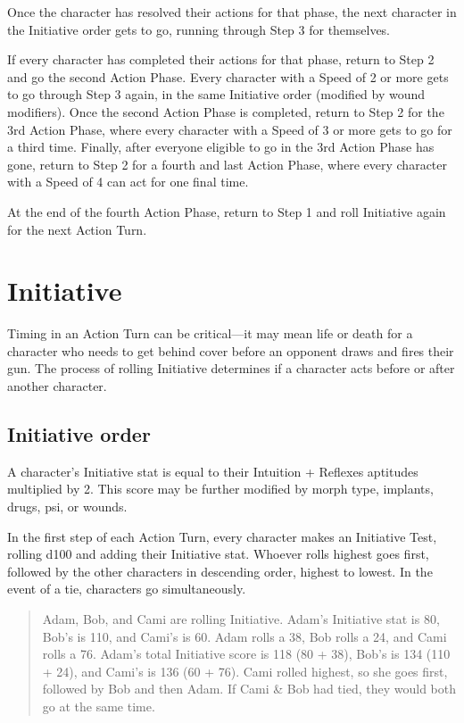 Once the character has resolved their actions for that phase, the next character in the Initiative order gets to go, running through Step 3 for themselves.

If every character has completed their actions for that phase, return to Step 2 and go the second Action Phase. Every character with a Speed of 2 or more gets to go through Step 3 again, in the same Initiative order (modified by wound modifiers). Once the second Action Phase is completed, return to Step 2 for the 3rd Action Phase, where every character with a Speed of 3 or more gets to go for a third time. Finally, after everyone eligible to go in the 3rd Action Phase has gone, return to Step 2 for a fourth and last Action Phase, where every character with a Speed of 4 can act for one final time.

At the end of the fourth Action Phase, return to Step 1 and roll Initiative again for the next Action Turn.


\section{Initiative}
\label{sec:initiative}

Timing in an Action Turn can be critical—it may mean life or death for a character who needs to get behind cover before an opponent draws and fires their gun. The process of rolling Initiative determines if a character acts before or after another character.


\subsection{Initiative order}
\label{sec:initiative-order}

A character’s Initiative stat is equal to their Intuition + Reflexes aptitudes multiplied by 2. This score may be further modified by morph type, implants, drugs, psi, or wounds.

In the first step of each Action Turn, every character makes an Initiative Test, rolling d100 and adding their Initiative stat. Whoever rolls highest goes first, followed by the other characters in descending order, highest to lowest. In the event of a tie, characters go simultaneously.

\begin{quotation}
Adam, Bob, and Cami are rolling Initiative. Adam’s Initiative stat is 80, Bob’s is 110, and Cami’s is 60. Adam rolls a 38, Bob rolls a 24, and Cami rolls a 76. Adam’s total Initiative score is 118 (80 + 38), Bob’s is 134 (110 + 24), and Cami’s is 136 (60 + 76). Cami rolled highest, so she goes first, followed by Bob and then Adam. If Cami & Bob had tied, they would both go at the same time.
\end{quotation}


